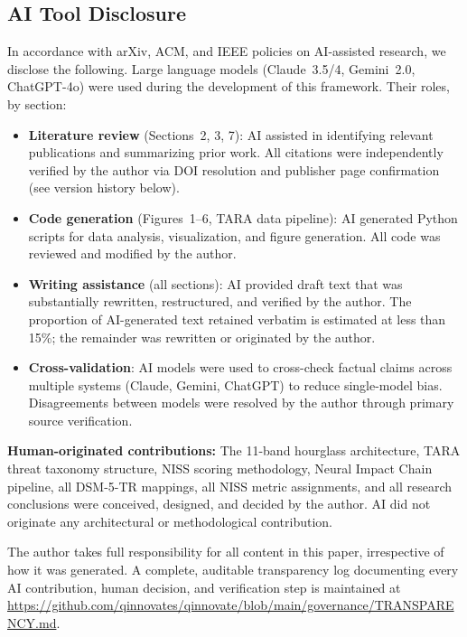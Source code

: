 \subsection{AI Tool Disclosure}

In accordance with arXiv, ACM, and IEEE policies on AI-assisted research, we
disclose the following. Large language models (Claude~3.5/4, Gemini~2.0, ChatGPT-4o)
were used during the development of this framework. Their roles, by section:

\begin{itemize}
  \item \textbf{Literature review} (Sections~2, 3, 7): AI assisted in identifying
        relevant publications and summarizing prior work. All citations were
        independently verified by the author via DOI resolution and publisher page
        confirmation (see version history below).
  \item \textbf{Code generation} (Figures~1--6, TARA data pipeline): AI generated
        Python scripts for data analysis, visualization, and figure generation. All
        code was reviewed and modified by the author.
  \item \textbf{Writing assistance} (all sections): AI provided draft text that was
        substantially rewritten, restructured, and verified by the author. The
        proportion of AI-generated text retained verbatim is estimated at less
        than 15\%; the remainder was rewritten or originated by the author.
  \item \textbf{Cross-validation}: AI models were used to cross-check factual claims
        across multiple systems (Claude, Gemini, ChatGPT) to reduce single-model
        bias. Disagreements between models were resolved by the author through
        primary source verification.
\end{itemize}

\noindent\textbf{Human-originated contributions:} The 11-band hourglass architecture,
TARA threat taxonomy structure, NISS scoring methodology, Neural Impact Chain
pipeline, all DSM-5-TR mappings, all NISS metric assignments, and all research
conclusions were conceived, designed, and decided by the author. AI did not
originate any architectural or methodological contribution.

\noindent The author takes full responsibility for all content in this paper,
irrespective of how it was generated. A complete, auditable transparency log
documenting every AI contribution, human decision, and verification step is
maintained at
\url{https://github.com/qinnovates/qinnovate/blob/main/governance/TRANSPARENCY.md}.

